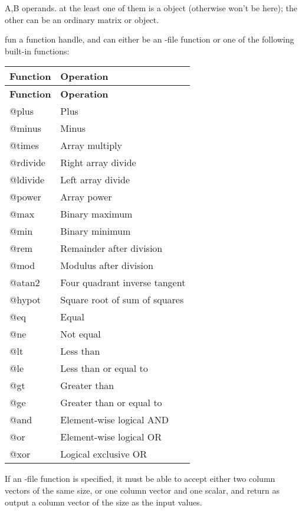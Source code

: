 \where
   \begin{argdesc}
   \item[A,B] operands. at the least one of them is a \myfints{} object 
        (otherwise \matlab{} won't be here); the other can be an ordinary 
        \matlab{} matrix or \myfints{} object.
   \item[fun] a function handle, and can either be an -file function or 
        one of the following built-in functions:
		   \begin{longtable}[c]{>{\ttfamily}l<{} p{8cm}}
		      \textsf{\textbf{Function}} & \textsf{\textbf{Operation}}\\
		      \toprule
		      \endfirsthead
		      \textsf{\textbf{Function}} & \textsf{\textbf{Operation}}\\
		      \toprule
		      \endhead
		      \bottomrule
		      \endfoot
		      \bottomrule
		      \endlastfoot
				@plus    & Plus\\
				@minus   & Minus\\
				@times   & Array multiply\\
				@rdivide & Right array divide\\
				@ldivide & Left array divide\\
				@power   & Array power\\
				@max     & Binary maximum\\
				@min     & Binary minimum\\
				@rem     & Remainder after division\\
				@mod     & Modulus after division\\
				@atan2   & Four quadrant inverse tangent\\
				@hypot   & Square root of sum of squares\\
				@eq      & Equal\\
				@ne      & Not equal\\
				@lt      & Less than\\
				@le      & Less than or equal to\\
				@gt      & Greater than\\
				@ge      & Greater than or equal to\\
				@and     & Element-wise logical AND\\
				@or      & Element-wise logical OR\\
				@xor     & Logical exclusive OR\\
  		   \end{longtable}
  		   
  		   If an -file function is specified, 
  		   it must be able to accept either two column vectors of the same size, 
  		   or one column vector and one scalar, and return as output a column vector of the size as the input values.
   \end{argdesc}

